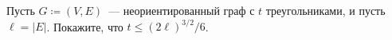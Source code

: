 Пусть $G \coloneqq (V, E)$~--- неориентированный граф с $t$ треугольниками, и пусть $\ell =
|E|$. Покажите, что $t \le (2 \ell)^{3 / 2} / 6$.